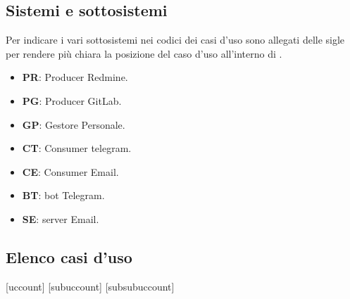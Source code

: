 	\subsection{Sistemi e sottosistemi}
	Per indicare i vari sottosistemi nei codici dei casi d'uso sono allegati delle sigle per rendere più chiara la posizione del caso d'uso all'interno di \progetto.
	\begin{itemize}
		\item \textbf{PR}: Producer Redmine.
		\item \textbf{PG}: Producer GitLab.
		\item \textbf{GP}: Gestore Personale.
		\item \textbf{CT}: Consumer telegram.
		\item \textbf{CE}: Consumer Email.
		\item \textbf{BT}: bot Telegram.
		\item \textbf{SE}: server Email.
	\end{itemize}

	\clearpage

	\subsection{Elenco casi d'uso}


[uccount]
[subuccount]
[subsubuccount]




















